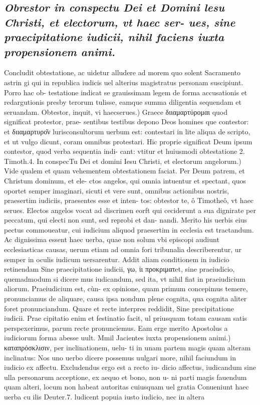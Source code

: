 \documentclass{article}
\begin{document}
\begin{pages}
\subsection*{\textit{Obrestor in conspectu Dei et Domini lesu Christi, et electorum, vt haec ser- ues, sine praecipitatione iudicii, nihil faciens iuxta propensionem animi. }}\pstart Concludit obtestatione, ac uidetur alludere ad morem quo solent Sacramento astrin gi qui in republica iudicis uel alterius magistratus personam suscipiunt. Porro hac ob- testatione indicat se grauissimam legem de forma accusationis et redargutionis presby terorum tulisse, eamque summa diligentia sequendam et seruandam.  \pend\pstart Obtestor, inquit, vi haecserues.) Graece διιαμαρτύρομαι quod significat protestor, prae- sentibus testibus depono Deos homines que contestor: et διιαμαρτυρο͂ν lurisconsultorum uerbum est: contestari in lite aliqua de scripto, et ut vulgo dicunt, coram omnibus protestari. Hic proprie significat Deum ipsum contestor, quod verba sequentia indi- cant: vtitur et huiusmodi obtestatione 2. Timoth.4.  \pend\pstart In conspecTu Dei et domini Iesu Christi, et electorum angelorum.) Vide qualem et quam vehementem obtestationem faciat. Per Deum patrem, et Christum dominum, et ele- ctos angelos, qui omnia intuentur et spectant, quos oportet semper imaginari, sicuti et vere sunt, omnibus actionibus nostris, praesertim iudiciis, praesentes esse et inten- tos: obtestor te, ô Timotheô, vt haec serues. Electos angelos vocat ad discrimen eorft qui ceciderunt a sua dignirate per peccatum, qui electi non sunt, sed reprobi et dan- nandi. Merito his uerbis eius pectus commoueatur, cui iudicium aliquod praesertim in ecclesia est tractandum. Ac dignissima essent haec uerba, quae non solum vbi episcopi audiunt ecclesiasticas causas, uerum etiam ad omnia fori tribunalia describerentur, ur semper in oculis iudicum uersarentur. Addit aliam conditionem in iudicio retinendam Sine praecipitatione iudicii, γω, ἰι προκριματet, sine praeiudicio, quemadmodum si dicere mus iudicandum, sed ita, vt nihil fiat in praeiudicium aliorum. Praeiudicium est, cùn- ex opinione, quam primum concepimus temere, pronunciamus de aliquare, causa ipsa nondum plene cognita, qua cognita aliter foret pronunciandum. Quare et recte interpres reddidit, Sine precipitatione iudicii. Prae cipitatio enim et festinatio facit, ul priusquam totam causam satis perspexerimus, parum recte pronunciemus. Eam erge merito Apostolus a iudiciorum forma abesse uult.  \pend\pstart Mmil Jacientes iuxta propensionem animi.) καταπρόσκλισιν, per inclinationem, uelu- ti in unam partem magis quam alteram inclinatus: Nos uno uerbo dicere possemus uulgari more, nihil faciundum in iudicio ex affectu. Excludendus ergo est a recto iu- dicio affectus, iudicandum sine ulla personarum acceptione, ex aequo et bono, non u- ni parti magis fauendum quam alteri, locum non habeat autoritas cuiusquam uel gratia Conueniunt haec uerba cu ilis Deuter.7. ludicent popuia iusto iudicio, nec in altera  \pend

\end{pages}
\end{document}
